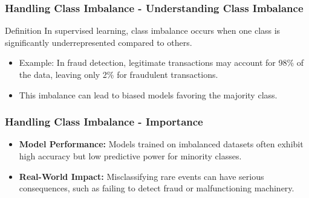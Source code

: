 \documentclass[aspectratio=169]{beamer}
\begin{document}
\begin{frame}[fragile]
    \frametitle{Handling Class Imbalance - Understanding Class Imbalance}
    \begin{block}{Definition}
        In supervised learning, class imbalance occurs when one class is significantly underrepresented compared to others. 
    \end{block}
    \begin{itemize}
        \item Example: In fraud detection, legitimate transactions may account for 98\% of the data, leaving only 2\% for fraudulent transactions.
        \item This imbalance can lead to biased models favoring the majority class.
    \end{itemize}
\end{frame}

\begin{frame}[fragile]
    \frametitle{Handling Class Imbalance - Importance}
    \begin{itemize}
        \item \textbf{Model Performance:} 
        Models trained on imbalanced datasets often exhibit high accuracy but low predictive power for minority classes.
        
        \item \textbf{Real-World Impact:} 
        Misclassifying rare events can have serious consequences, such as failing to detect fraud or malfunctioning machinery.
    \end{itemize}
\end{frame}
\end{document}
